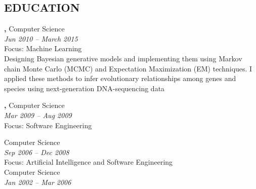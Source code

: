 \documentclass[margin, 10pt]{res} %
\begin{document}
\begin{resume}

\section{EDUCATION}

{\bf \color{Black}{Doctor of Philosophy},} Computer Science \\
{} \hfill \textit{Jun 2010 -- March 2015} \\
Focus: Machine Learning \\
Designing Bayesian generative models and implementing them using Markov chain Monte Carlo (MCMC) and Expectation Maximization (EM) techniques. I applied these methods to infer evolutionary relationships among genes and species using next-generation DNA-sequencing data %

{\bf \color{Black}{Exchange Student},} Computer Science \\
{\color{RubineRed}{University of Limerick, Ireland}} \hfill \textit{Mar 2009 -- Aug 2009} \\
Focus: Software Engineering 

{\bf \color{Black}{Master of Science,}} Computer Science \\ %
{\color{RubineRed}{Lahore University of Management Sciences, Pakistan}} \hfill \textit{Sep 2006 -- Dec 2008} \\
Focus: Artificial Intelligence and Software Engineering \\

{\bf \color{Black}{Bachelor of Science,}} Computer Science \\ %
{\color{RubineRed}{University of Peshawar, Pakistan}} \hfill \textit{Jan 2002 -- Mar 2006} \\



\end{resume}
\end{document}
